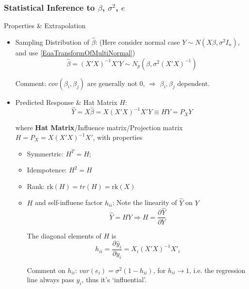\subsubsection{Statistical Inference to $ \beta  $, $ \sigma ^2 $, $ e $}\label{SubSubSectionStatisticalInferenceInMultiLRA}
    Properties \& Extrapolation
\begin{itemize}[topsep=2pt,itemsep=2pt]
    \item Sampling Distribution of $ \hat{\beta } $: (Here consider normal case $ Y\sim N(X\beta ,\sigma^2I_n) $, and use \autoref{EqaTransformOfMultiNormal}) 
    \begin{equation}\label{EqaDistributionOfMultiVariateBeta}
        \hat{\beta }=(X'X)^{-1}X'Y \sim N_p(\beta,\sigma^2(X'X)^{-1})
    \end{equation}

    Comment: $ cov(\beta_i,\beta_j ) $ are generally not 0, $ \Rightarrow $ $ \beta _i,\beta _j $ dependent.
    \item Predicted Response \& Hat Matrix $ H $:
    \begin{equation}
        \hat{Y}=X\hat{\beta }=X(X'X)^{-1}X'Y\equiv  HY=P_XY
    \end{equation}

    where \textbf{Hat Matrix}/Influence matrix/Projection matrix $ H=P_X=X(X'X)^{-1}X' $, with properties
    \begin{itemize}[topsep=2pt,itemsep=2pt]
        \item Symmertric: $ H^T=H $;
        \item Idempotence: $ H^2=H $
        \item Rank: $ \mathrm{rk}(H)=tr(H)=\mathrm{rk}(X)   $
        \item $ H $ and self-influene factor $ h_{ii} $: Note the linearity of $ \hat{Y} $ on $ Y $
        \begin{equation}
            \hat{Y}=HY \Rightarrow H=\dfrac{\partial^{} \hat{Y}}{\partial Y^{}}
        \end{equation} 
    
        The diagonal elements of $ H $ is 
        \begin{equation}
            h_{ii}=\dfrac{\partial^{}\hat{y}_i}{\partial y_i^{}}=X_i(X'X)^{-1}X'_i
        \end{equation}

        Comment on $ h_{ii} $: $ var(e_i) =\sigma ^2(1-h_{ii})$, for $ h_{ii}\to 1 $, i.e. the regression line always pass $ y_i $, thus it's `influential'.
    \end{itemize}


\end{itemize}

